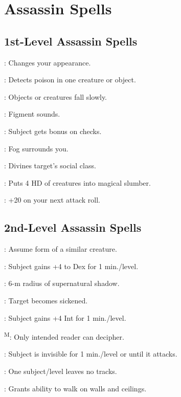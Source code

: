 \section{Assassin Spells}




\subsection{1st-Level Assassin Spells}

: Changes your appearance.

: Detects poison in one creature or object.

: Objects or creatures fall slowly.

: Figment sounds.

: Subject gets bonus on  checks.

: Fog surrounds you.

: Divines target's social class. %

: Puts 4 HD of creatures into magical slumber.

: +20 on your next attack roll.




\subsection{2nd-Level Assassin Spells}

: Assume form of a similar creature.

: Subject gains +4 to Dex for 1 min./level.

: 6-m radius of supernatural shadow.

: Target becomes sickened. %

: Subject gains +4 Int for 1 min./level.

\textsuperscript{M}: Only intended reader can decipher.

: Subject is invisible for 1 min./level or until it attacks.

: One subject/level leaves no tracks.

: Grants ability to walk on walls and ceilings.

